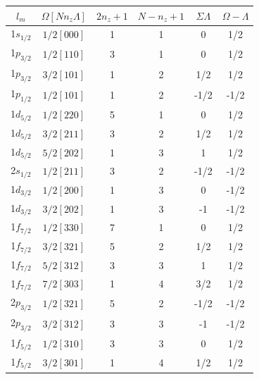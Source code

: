 \documentclass[8pt,a4paper, twoside]{report}
\begin{document}
\begin{table}[htbp]
\center
\begin{tabular}{|c|c|c|c|c|c|}
\toprule
\toprule
$l_m$      & $\Omega[Nn_z\Lambda]$ & $2n_z + 1$ & $N - n_z + 1$ & $\Sigma\Lambda$ & $\Omega - \Lambda$ \\
\midrule
1$s_{1/2}$ & $1/2[000]$            & 1          & 1             & 0       &   1/2     \\
1$p_{3/2}$ & $1/2[110]$            & 3          & 1             & 0      &   1/2      \\
1$p_{3/2}$ & $3/2[101]$            & 1          & 2             & 1/2   &   1/2           \\
1$p_{1/2}$ & $1/2[101]$            & 1          & 2             & -1/2    &   -1/2       \\
\midrule
1$d_{5/2}$ & $1/2[220]$            & 5          & 1             & 0      & 1/2        \\
1$d_{5/2}$ & $3/2[211]$            & 3          & 2             & 1/2    & 1/2           \\
1$d_{5/2}$ & $5/2[202]$            & 1          & 3             & 1       & 1/2        \\
2$s_{1/2}$ & $1/2[211]$            & 3          & 2             & -1/2      & -1/2         \\
1$d_{3/2}$ & $1/2[200]$            & 1          & 3             & 0         & -1/2      \\
1$d_{3/2}$ & $3/2[202]$            & 1          & 3             & -1       & -1/2        \\
\midrule
1$f_{7/2}$ & $1/2[330]$            & 7          & 1             & 0        & 1/2       \\
1$f_{7/2}$ & $3/2[321]$            & 5          & 2             & 1/2      & 1/2         \\
1$f_{7/2}$ & $5/2[312]$            & 3          & 3             & 1          & 1/2     \\
1$f_{7/2}$ & $7/2[303]$            & 1          & 4             & 3/2       & 1/2        \\
2$p_{3/2}$ & $1/2[321]$            & 5          & 2             & -1/2      & -1/2         \\
2$p_{3/2}$ & $3/2[312]$            & 3          & 3             & -1       & -1/2        \\
1$f_{5/2}$ & $1/2[310]$            & 3          & 3             & 0         & 1/2      \\
1$f_{5/2}$ & $3/2[301]$            & 1          & 4             & 1/2      & 1/2         \\

\end{tabular}
\end{table}
\end{document}
